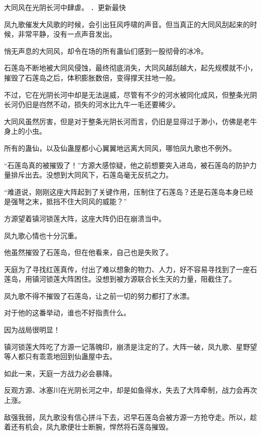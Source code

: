 
\begin{this_body}

大同风在光阴长河中肆虐。 ．更新最快

凤九歌催发大风歌的时候，会引出狂风呼啸的声音。但当真正的大同风刮起来的时候，非常平静，没有一点声音发出。

悄无声息的大同风，却令在场的所有蛊仙们感到一股彻骨的冰冷。

石莲岛不断地被大同风侵蚀，最终彻底消失，大同风越刮越大，起先规模就不小，摧毁了石莲岛之后，体积膨胀数倍，变得撑天拄地一般。

不过，它在光阴长河中却是无法逞威，尽管有不少的河水被同化成风，但整条光阴长河仍旧是岿然不动，损失的河水比九牛一毛还要稀少。

大同风虽然厉害，但是对于整条光阴长河而言，仍旧是显得过于渺小，仿佛是老牛身上的小虫。

所有的蛊仙，以及仙蛊屋都小心翼翼地远离大同风，哪怕凤九歌也不例外。

“石莲岛真的被摧毁了！”方源大感惊疑，他之前想要突入进岛，被石莲岛的防护力量排斥出去。没想到大同风下，石莲岛毫无反抗之力。

“难道说，刚刚这座大阵起到了关键作用，压制住了石莲岛？还是石莲岛本身已经是强弩之末，抵挡不住大同风的威能？”

方源望着镇河锁莲大阵，这座大阵仍旧在崩溃当中。

凤九歌心情也十分沉重。

他虽然摧毁了石莲岛，但在他看来，自己也是失败了。

天庭为了寻找红莲真传，付出了难以想象的物力、人力，好不容易寻找到了一座石莲岛，用镇河锁莲大阵困住。没想到被方源联合长生天的力量，阻截住了。

凤九歌不得不摧毁了石莲岛，让之前一切的努力都打了水漂。

对于他的这番举动，谁也不好指责什么。

因为战局很明显！

镇河锁莲大阵吃了方源一记落魄印，崩溃是注定的了。大阵一破，凤九歌、星野望等人都只有乖乖地回到仙蛊屋中去。

如此一来，天庭一方战力必会暴降。

反观方源、冰塞川在光阴长河之中，却是如鱼得水，失去了大阵牵制，战力会再次上涨。

敌强我弱，凤九歌没有信心拼斗下去，迟早石莲岛会被方源一方抢夺走。所以，趁着还有机会，凤九歌便壮士断腕，悍然将石莲岛摧毁。


\end{this_body}
